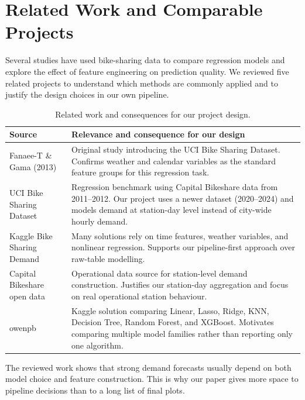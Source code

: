 \section{Related Work and Comparable Projects}

Several studies have used bike-sharing data to compare regression models 
and explore the effect of feature engineering on prediction quality. 
We reviewed five related projects to understand which methods are commonly 
applied and to justify the design choices in our own pipeline.

\begin{table}[htbp]
\caption{Related work and consequences for our project design.}
\centering
\scriptsize
\begin{tabularx}{\columnwidth}{p{} X}
\toprule
\textbf{Source} & \textbf{Relevance and consequence for our design} \\
\midrule
Fanaee-T \& Gama (2013) \cite{fanaee2013} & 
Original study introducing the UCI Bike Sharing Dataset. Confirms 
weather and calendar variables as the standard feature groups for 
this regression task. \\
\addlinespace
UCI Bike Sharing Dataset \cite{uci_bike} & 
Regression benchmark using Capital Bikeshare data from 2011--2012. 
Our project uses a newer dataset (2020--2024) and models demand at 
station-day level instead of city-wide hourly demand. \\
\addlinespace
Kaggle Bike Sharing Demand \cite{kaggle_competition} & 
Many solutions rely on time features, weather variables, and 
nonlinear regression. Supports our pipeline-first approach over 
raw-table modelling. \\
\addlinespace
Capital Bikeshare open data \cite{capital_system_data} & 
Operational data source for station-level demand construction. 
Justifies our station-day aggregation and focus on real operational 
station behaviour. \\
\addlinespace
owenpb \cite{owenpb_github} & 
Kaggle solution comparing Linear, Lasso, Ridge, KNN, Decision Tree, 
Random Forest, and XGBoost. Motivates comparing multiple model 
families rather than reporting only one algorithm. \\
\bottomrule
\end{tabularx}
\end{table}

The reviewed work shows that strong demand forecasts usually depend on 
both model choice and feature construction. This is why our paper gives 
more space to pipeline decisions than to a long list of final plots.